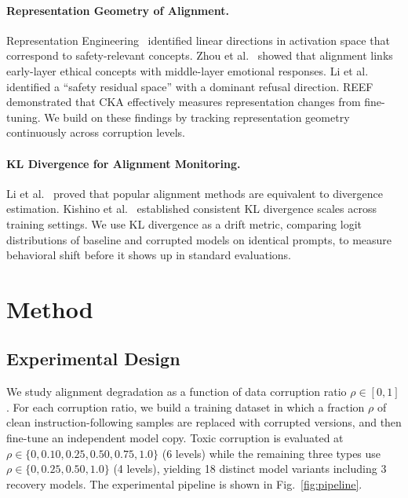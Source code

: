 \documentclass[conference]{IEEEtran}
\begin{document}
\paragraph{Representation Geometry of Alignment.}
Representation Engineering~\cite{zou2023representation} identified linear directions in activation space that correspond to safety-relevant concepts. Zhou et al.~\cite{zhou2024alignment} showed that alignment links early-layer ethical concepts with middle-layer emotional responses. Li et al.~\cite{li2025hidden} identified a ``safety residual space'' with a dominant refusal direction. REEF~\cite{xu2025reef} demonstrated that CKA effectively measures representation changes from fine-tuning. We build on these findings by tracking representation geometry continuously across corruption levels.

\paragraph{KL Divergence for Alignment Monitoring.}
Li et al.~\cite{li2025divergence} proved that popular alignment methods are equivalent to divergence estimation. Kishino et al.~\cite{kishino2025scale} established consistent KL divergence scales across training settings. We use KL divergence as a drift metric, comparing logit distributions of baseline and corrupted models on identical prompts, to measure behavioral shift before it shows up in standard evaluations.

\section{Method}
\label{sec:method}

\subsection{Experimental Design}

We study alignment degradation as a function of data corruption ratio $\rho \in [0, 1]$. For each corruption ratio, we build a training dataset in which a fraction $\rho$ of clean instruction-following samples are replaced with corrupted versions, and then fine-tune an independent model copy. Toxic corruption is evaluated at $\rho \in \{0, 0.10, 0.25, 0.50, 0.75, 1.0\}$ (6 levels) while the remaining three types use $\rho \in \{0, 0.25, 0.50, 1.0\}$ (4 levels), yielding 18 distinct model variants including 3 recovery models. The experimental pipeline is shown in Fig.~\ref{fig:pipeline}.
\end{document}
